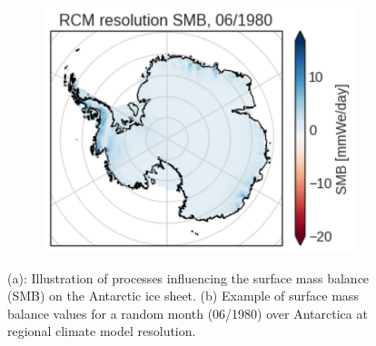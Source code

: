 \documentclass[a4paper,11pt,oneside]{report}
\begin{document}
\begin{itemize}
\begin{figure}[tbp]
\begin{subfigure}[b]{0.45\columnwidth}
            \centering \includegraphics[width=\textwidth]{doc/Thesis-latex/images/smb-example.pdf}
            \caption[]%
            {{\small }}    
          \label{fig:example-smb}
        \end{subfigure}
        \caption[]
        {\small (a): Illustration of processes influencing the surface mass balance (SMB) on the Antarctic ice sheet. (b) Example of surface mass balance values for a random month (06/1980) over Antarctica at regional climate model resolution.
        } 
        \label{fig:example-smb-and-processes}
    \end{figure}
    

\end{itemize}
\end{document}
